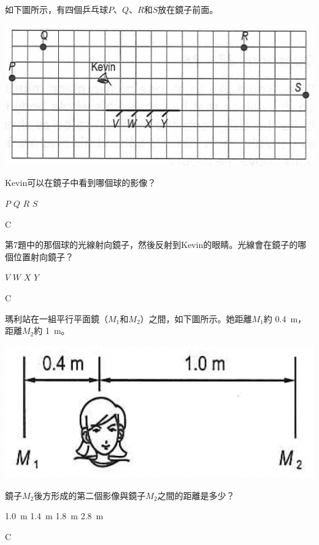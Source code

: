 {
    如下圖所示，有四個乒乓球$P$、$Q$、$R$和$S$放在鏡子前面。
    \par{\par\centering\includegraphics[width=.4\textwidth]{./img/ch1prob_2024-05-18-15-26-34.png}\par}
}{}
{
    Kevin可以在鏡子中看到哪個球的影像？
    \begin{tasks}
        \task $P$
        \task $Q$
        \task $R$
        \task $S$
    \end{tasks}

}{\mckey C}

{
    第7題中的那個球的光線射向鏡子，然後反射到Kevin的眼睛。光線會在鏡子的哪個位置射向鏡子？
    \begin{tasks}
        \task $V$
        \task $W$
        \task $X$
        \task $Y$
    \end{tasks}

}{\mckey C}

{
    瑪利站在一組平行平面鏡（$M_1$和$M_2$）之間，如下圖所示。她距離$M_1$約 \qty{0.4}{m}，距離$M_2$約 \qty{1}{m}。
    \par{\par\centering\includegraphics[width=.35\textwidth]{./img/ch1prob_2024-05-18-16-14-20.png}\par}
    鏡子$M_2$後方形成的第二個影像與鏡子$M_2$之間的距離是多少？

    \begin{tasks}
        \task \qty{1.0}{m}
        \task \qty{1.4}{m}
        \task \qty{1.8}{m}
        \task \qty{2.8}{m}
    \end{tasks}

}{\mckey C}

